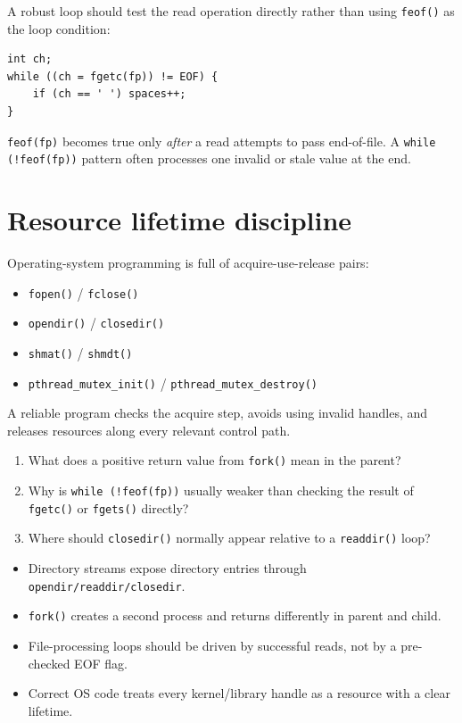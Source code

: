 A robust loop should test the read operation directly rather than using \texttt{feof()} as the loop condition:
\begin{lstlisting}[style=osc]
int ch;
while ((ch = fgetc(fp)) != EOF) {
    if (ch == ' ') spaces++;
}
\end{lstlisting}

\begin{pitfall}
\texttt{feof(fp)} becomes true only \emph{after} a read attempts to pass end-of-file. A \texttt{while (!feof(fp))} pattern often processes one invalid or stale value at the end.
\end{pitfall}

\section{Resource lifetime discipline}
Operating-system programming is full of acquire-use-release pairs:
\begin{itemize}
  \item \texttt{fopen()} / \texttt{fclose()}
  \item \texttt{opendir()} / \texttt{closedir()}
  \item \texttt{shmat()} / \texttt{shmdt()}
  \item \texttt{pthread\_mutex\_init()} / \texttt{pthread\_mutex\_destroy()}
\end{itemize}
A reliable program checks the acquire step, avoids using invalid handles, and releases resources along every relevant control path.

\begin{quickcheck}
\begin{enumerate}
  \item What does a positive return value from \texttt{fork()} mean in the parent?
  \item Why is \texttt{while (!feof(fp))} usually weaker than checking the result of \texttt{fgetc()} or \texttt{fgets()} directly?
  \item Where should \texttt{closedir()} normally appear relative to a \texttt{readdir()} loop?
\end{enumerate}
\end{quickcheck}






\begin{chapterrecap}
\begin{itemize}
  \item Directory streams expose directory entries through \texttt{opendir/readdir/closedir}.
  \item \texttt{fork()} creates a second process and returns differently in parent and child.
  \item File-processing loops should be driven by successful reads, not by a pre-checked EOF flag.
  \item Correct OS code treats every kernel/library handle as a resource with a clear lifetime.
\end{itemize}
\end{chapterrecap}
